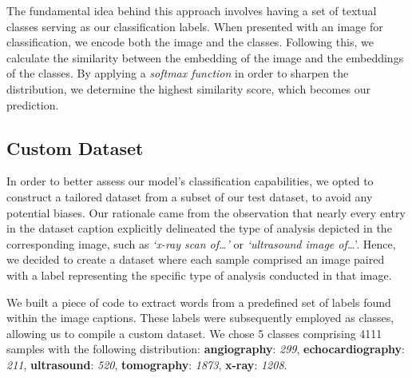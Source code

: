 \documentclass[10pt,twocolumn,letterpaper]{article}
\begin{document}
The fundamental idea behind this approach involves having a set of textual classes serving as our classification labels.
When presented with an image for classification, we encode both the image and the classes.
Following this, we calculate the similarity between the embedding of the image and the embeddings of the classes.
By applying a \textit{softmax function} in order to sharpen the distribution, we determine the highest similarity score, which becomes our prediction.

\subsection{Custom Dataset}
In order to better assess our model's classification capabilities, we opted to construct a tailored dataset from a subset of our test dataset, to avoid any potential biases.
Our rationale came from the observation that nearly every entry in the dataset caption explicitly delineated the type of analysis depicted in the corresponding image, such as \textit{`x-ray scan of\ldots'} or \textit{`ultrasound image of\ldots}'.
Hence, we decided to create a dataset where each sample comprised an image paired with a label representing the specific type of analysis conducted in that image.

We built a piece of code to extract words from a predefined set of labels found within the image captions.
These labels were subsequently employed as classes, allowing us to compile a custom dataset.
We chose 5 classes comprising 4111 samples with the following distribution: \textbf{angiography}: \textit{299}, \textbf{echocardiography}: \textit{211}, \textbf{ultrasound}: \textit{520}, \textbf{tomography}: \textit{1873}, \textbf{x-ray}: \textit{1208}.

\end{document}
